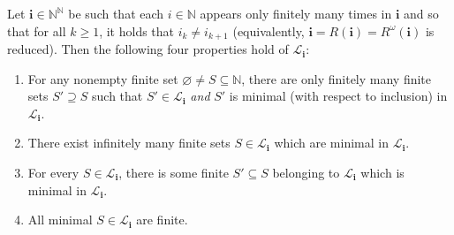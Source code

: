 \documentclass[10pt,a4paper]{amsart}
\newcommand{\NN}{\mathbb{N}}
\begin{document}
\begin{Prop}\label{linking-prop}
    Let $\mathbf i\in\NN^\NN$ be such that each $i\in\NN$ appears only finitely many times in $\mathbf i$ and so that for all $k\geq1$, it holds that $i_k\neq i_{k+1}$ (equivalently, $\mathbf i=R(\mathbf i)=R^\omega(\mathbf i)$ is reduced). Then the following four properties hold of $\mathcal L_\mathbf i$:
    \begin{enumerate}[label=(\roman*)]
        \item For any nonempty finite set $\varnothing\neq S\subseteq\NN$, there are only finitely many finite sets $S'\supseteq S$ such that $S'\in\mathcal L_\mathbf i$ \emph{and} $S'$ is minimal (with respect to inclusion) in $\mathcal L_\mathbf i$.
        \item There exist infinitely many finite sets $S\in\mathcal L_\mathbf i$ which are minimal in $\mathcal L_\mathbf i$.
        \item For every $S\in\mathcal L_\mathbf i$, there is some finite $S'\subseteq S$ belonging to $\mathcal L_\mathbf i$ which is minimal in $\mathcal L_\mathbf i$.
        \item All minimal $S\in\mathcal L_\mathbf i$ are finite.
    \end{enumerate}
\end{Prop}
\end{document}
